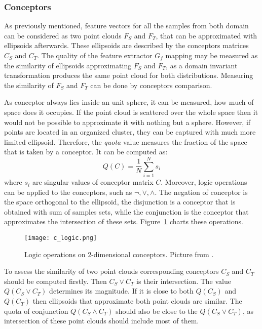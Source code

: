 \documentclass{article}
\begin{document}
\subsubsection{Conceptors}
As previously mentioned, feature vectors for all the samples from both domain can be considered as two point clouds $F_{S}$ and $F_{T}$, that can be approximated with ellipsoids afterwards. These ellipsoids are described by the conceptors matrices $C_{S}$ and $C_{T}$. The quality of the feature extractor $G_{f}$ mapping may be measured as the similarity of ellipsoids approximating $F_{S}$ and $F_{T}$, as a domain invariant transformation produces the same point cloud for both distributions. Measuring the similarity of $F_{S}$ and $F_{T}$ can be done by conceptors comparison. 
\par
As conceptor always lies inside an unit sphere, it can be measured, how much of space does it occupies. If the point cloud is scattered over the whole space then it would not be possible to approximate it with nothing but a sphere. However, if points are located in an organized cluster, they can be captured with much more limited ellipsoid. Therefore, the \textit{quota} value measures the fraction of the space that is taken by a conceptor. It can be computed as:
\begin{equation*}
    Q(C) = \frac{1}{N} \sum_{i=1}^{N}{s_{i}}
\end{equation*}
where $s_{i}$ are singular values of conceptor matrix $C$. Moreover, logic operations  can be applied to the conceptors, such as $\neg, \vee, \wedge$. The negation of conceptor is the space orthogonal to the ellipsoid, the disjunction is a conceptor that is obtained with sum of samples sets, while the conjunction is the conceptor that approximates the intersection of these sets. Figure~\ref{fig:conceptor_logic} charts these operations.
\begin{figure}%
    \centering
    \texttt{[image: c\_logic.png]}%
    \caption{Logic operations on 2-dimensional conceptors. Picture from \cite{overc}.}
    \label{fig:conceptor_logic}%
\end{figure}
\par
To assess the similarity of two point clouds corresponding conceptors $C_{S}$ and $C_{T}$ should be computed firstly. Then $C_{S} \vee C_{T}$ is their intersection. The value $Q(C_{S} \vee C_{T})$ determines its magnitude. If it is close to both $Q(C_{S})$ and $Q(C_{T})$ then ellipsoids that approximate both point clouds are similar. The quota of conjunction $Q(C_{S} \wedge C_{T})$ should also be close to the $Q(C_{S} \vee C_{T})$, as intersection of these point clouds should include most of them.
\end{document}
